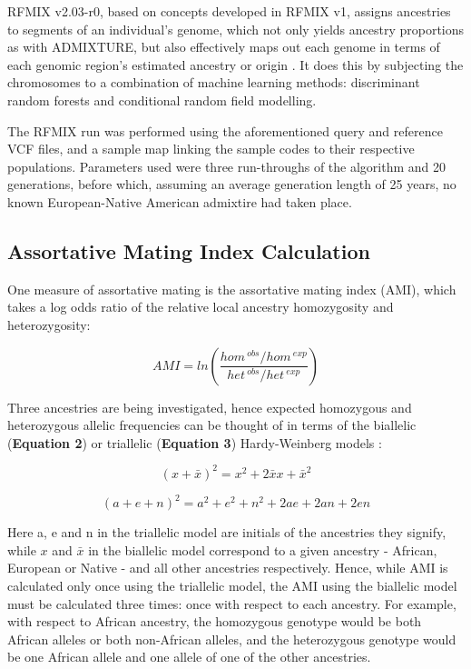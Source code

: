 \documentclass[11pt]{article}
\begin{document}
RFMIX v2.03-r0, based on concepts developed in RFMIX v1, assigns ancestries to segments of an individual's genome, which not only yields ancestry proportions as with ADMIXTURE, but also effectively maps out each genome in terms of each genomic region's estimated ancestry or origin \parencite{Maples2013}. It does this by subjecting the chromosomes to a combination of machine learning methods: discriminant random forests and conditional random field modelling.

The RFMIX run was performed using the aforementioned query and reference VCF files, and a sample map linking the sample codes to their respective populations. Parameters used were three run-throughs of the algorithm and 20 generations, before which, assuming an average generation length of 25 years, no known European-Native American admixtire had taken place.





\subsection{Assortative Mating Index Calculation}


One measure of assortative mating is the assortative mating index (AMI), which takes a log odds ratio of the relative local ancestry homozygosity and heterozygosity:


\begin{equation}
    AMI = ln{\left( \frac{ hom^{\: obs} / hom^{\: exp} }
                         { het^{\: obs} / het^{\: exp} } \right)}
\end{equation}
\vspace{3mm}


Three ancestries are being investigated, hence expected homozygous and heterozygous allelic frequencies can be thought of in terms of the biallelic (\textbf{Equation 2}) or triallelic (\textbf{Equation 3}) Hardy-Weinberg models \parencite{Norris2019}: 

\begin{equation}
    (x + \bar{x})^{2} = x^{2} + 2\bar{x}x + \bar{x}^{2}
\end{equation}


\begin{equation}
    (a + e + n)^{2} = a^{2} + e^{2} + n^{2} + 2ae + 2an + 2en
\end{equation}
\vspace{3mm}


Here a, e and n in the triallelic model are initials of the ancestries they signify, while $x$ and $\bar{x}$ in the biallelic model correspond to a given ancestry - African, European or Native - and all other ancestries respectively. Hence, while AMI is calculated only once using the triallelic model, the AMI using the biallelic model must be calculated three times: once with respect to each ancestry. For example, with respect to African ancestry, the homozygous genotype would be both African alleles or both non-African alleles, and the heterozygous genotype would be one African allele and one allele of one of the other ancestries.
\end{document}
